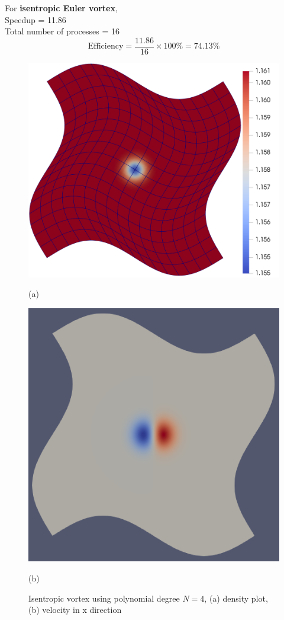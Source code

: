 \hspace{-18pt}For \textbf{isentropic Euler vortex},\\
Speedup = 11.86\\
Total number of processes = 16
\begin{equation*}
    \text{Efficiency} = \frac{11.86}{16} \times 100 \% =  74.13\%   
\end{equation*}
\begin{figure}[ht]
    \centering
    \begin{minipage}{0.5\textwidth}
        \centering
        \includegraphics[width=1.05\linewidth]{attachments/isentropic_arpit.png}
        \caption*{(a)}
    \end{minipage}%
    \begin{minipage}{0.5\textwidth}
        \centering
        \includegraphics[width=0.9\linewidth]{attachments/solution_068877_vx.png}
        \caption*{(b)}
    \end{minipage}
    \caption{Isentropic vortex using polynomial degree $N = 4$, (a) density plot, (b) velocity in x direction}
\end{figure}
